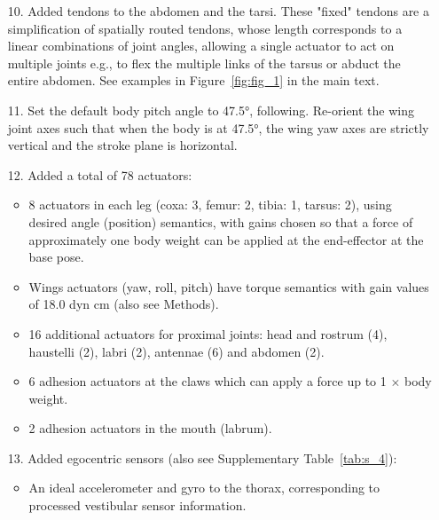 \documentclass[sn-mathphys-num]{sn-jnl}%
\theoremstyle{thmstyleone}%
\theoremstyle{thmstyletwo}%
\theoremstyle{thmstylethree}%
\begin{document}
\begin{appendices}
\begin{itemize}
	
	\item[10.] 
	Added tendons to the abdomen and the tarsi. 
	These "fixed" tendons are a simplification of spatially routed tendons, whose length corresponds to a linear combinations of joint angles, allowing a single actuator to act on multiple joints e.g., to flex the multiple links of the tarsus or abduct the entire abdomen. 
	See examples in Figure~\ref{fig:fig_1} in the main text.
	
	\item[11.] 
	Set the default body pitch angle to 47.5°, following\cite{muijres2014flies}. 
	Re-orient the wing joint axes such that when the body is at 47.5°, the wing yaw axes are strictly vertical and the stroke plane is horizontal.
	
	\item[12.] 
	Added a total of 78 actuators:
		\begin{itemize}
			\item 8 actuators in each leg (coxa: 3, femur: 2, tibia: 1, tarsus: 2), using desired angle (position) semantics, with gains chosen so that a force of approximately one body weight can be applied at the end-effector at the base pose.
			
			\item Wings actuators (yaw, roll, pitch) have torque semantics with gain values of 18.0 dyn cm (also see Methods).
			
			\item 
			16 additional actuators for proximal joints: head and rostrum (4), haustelli (2), labri (2), antennae (6) and abdomen (2).
			
			\item 
			6 adhesion actuators at the claws which can apply a force up to 1 $ \times $ body weight.
			
			\item 
			2 adhesion actuators in the mouth (labrum).
		\end{itemize}
	
	\item[13.] 
	Added egocentric sensors (also see Supplementary Table~\ref{tab:s_4}):
		\begin{itemize}
			\item An ideal accelerometer and gyro to the thorax, corresponding to processed vestibular sensor information.
			

\end{itemize}
\end{itemize}
\end{appendices}
\end{document}
